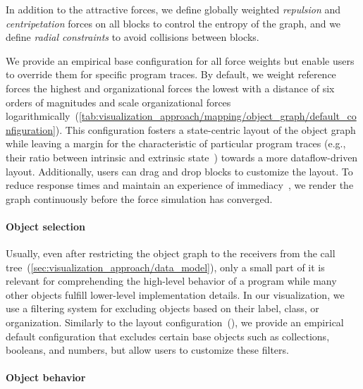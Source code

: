 In addition to the attractive forces, we define globally weighted \emph{repulsion} and \emph{centripetation} forces on all blocks to control the entropy of the graph, and we define \emph{radial constraints} to avoid collisions between blocks.

We provide an empirical base configuration for all force weights but enable users to override them for specific program traces.
By default, we weight reference forces the highest and organizational forces the lowest with a distance of six orders of magnitudes and scale organizational forces logarithmically~(\cref{tab:visualization_approach/mapping/object_graph/default_configuration}).
This configuration fosters a state-centric layout of the object graph while leaving a margin for the characteristic of particular program traces (e.g., their ratio between intrinsic and extrinsic state~\cite[p. 218ff]{gamma1994design}) towards a more dataflow-driven layout.
Additionally, users can drag and drop blocks to customize the layout.
To reduce response times and maintain an experience of immediacy~\cites[chap. 11]{shneiderman2005designing}{ungar1997debugging}, we render the graph continuously before the force simulation has converged.

\paragraph{Object selection}
\label{sec:visualization_approach/mapping/object_selection}

Usually, even after restricting the object graph to the receivers from the call tree~(\cref{sec:visualization_approach/data_model}), only a small part of it is relevant for comprehending the high-level behavior of a program while many other objects fulfill lower-level implementation details.
In our visualization, we use a filtering system for excluding objects based on their label, class, or organization.
Similarly to the layout configuration~(), we provide an empirical default configuration that excludes certain base objects such as collections, booleans, and numbers, but allow users to customize these filters.

\paragraph{Object behavior}
\label{sec:visualization_approach/mapping/object_behavior}

